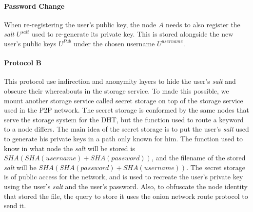 
\paragraph{Password Change}
When re-registering the user's public key, the node $A$ needs to also register the \textit{salt} $U^{salt}$ used to
re-generate its private key. This is stored alongside the new user's public keys $U^{Pub}$ under the
chosen username $U^{username}$.


\paragraph{Protocol B}

This protocol use indirection and anonymity layers to hide the user's
\textit{salt} and obscure their whereabouts in the storage service.
To made this possible, we mount another storage service called secret storage
on top of the storage service used in the P2P network. The secret storage is conformed
by the same nodes that serve the storage system for the DHT, but the function
used to route a keyword to a node differs. The main idea of the secret storage
is to put the user's \textit{salt} used to generate his private keys in a
path only known for him. The function used to know in what node the
\textit{salt} will be stored is $SHA(SHA(username)+SHA(password))$, and the
filename of the stored \textit{salt} will be
$SHA(SHA(password)+SHA(username))$. The secret storage is of public access for
the network, and is used to recreate the user's private key using the user's
\textit{salt} and the user's password. Also, to obfuscate the node identity that
stored the file, the query to store it uses the onion network route protocol to
send it.

